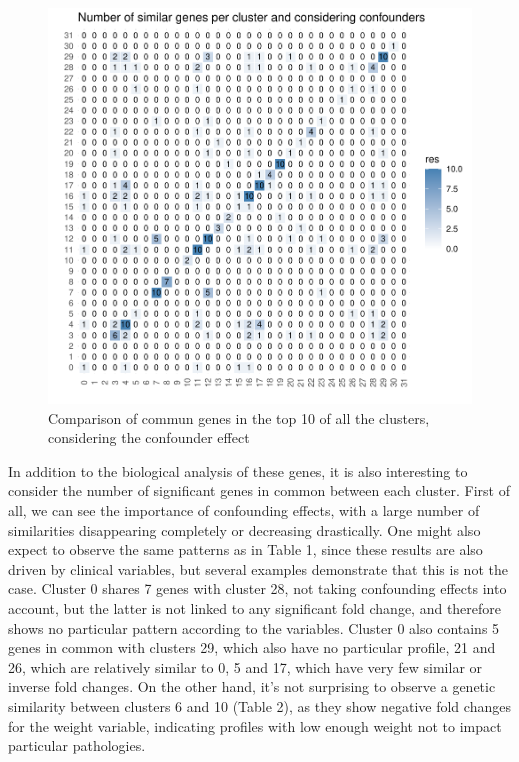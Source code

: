 \documentclass[a4paper, 11pt]{article}
\begin{document}
\begin{multicols}{2}
\begin{figure}[H]
	\centering
	\includegraphics[width=\columnwidth]{figures/final_analysis/SimilConsideringConf}
	\caption{Comparison of commun genes in the top 10 of all the clusters, considering the confounder effect}
	\label{fig:similGenesConf}
\end{figure}

In addition to the biological analysis of these genes, it is also interesting to consider the number of significant genes in common between each cluster. First of all, we can see the importance of confounding effects, with a large number of similarities disappearing completely or decreasing drastically. One might also expect to observe the same patterns as in Table 1, since these results are also driven by clinical variables, but several examples demonstrate that this is not the case. Cluster 0 shares 7 genes with cluster 28, not taking confounding effects into account, but the latter is not linked to any significant fold change, and therefore shows no particular pattern according to the variables. Cluster 0 also contains 5 genes in common with clusters 29, which also have no particular profile, 21 and 26, which are relatively similar to 0, 5 and 17, which have very few similar or inverse fold changes. On the other hand, it's not surprising to observe a genetic similarity between clusters 6 and 10 (Table 2), as they show negative fold changes for the weight variable, indicating profiles with low enough weight not to impact particular pathologies.


\end{multicols}
\end{document}
